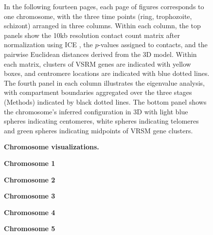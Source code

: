\thispagestyle{empty}
\pagestyle{empty}
\begin{figure}
\caption{{\bf Chromosome visualizations.}}
{ In the following fourteen pages, each page of figures corresponds to one chromosome, with the three time points (ring, trophozoite, schizont) arranged in three columns.  Within each column, the top panels show the 10kb resolution contact count matrix after normalization using ICE \cite{imakaev:iterative}, the $p$-values assigned to contacts, and the pairwise Euclidean distances derived from the 3D model.  Within each matrix, clusters of VSRM genes are indicated with yellow boxes, and centromere locations are indicated with blue dotted lines.  The fourth panel in each column illustrates the eigenvalue analysis, with compartment boundaries aggregated over the three stages (Methods) indicated by black dotted lines. The bottom panel shows the chromosome's inferred configuration in 3D with light blue spheres indicating centomeres, white spheres indicating telomeres and green spheres indicating midpoints of VRSM gene clusters.}
\label{suppfig:perChrFigs}
\end{figure}

\setcounter{figure}{2} %
\begin{figure}
\textbf{Chromosome 1}
\centering
{}
\end{figure}

\begin{figure}
\textbf{Chromosome 2}
\centering
\ContinuedFloat
{}
\end{figure}

\begin{figure}
\textbf{Chromosome 3}
\centering
\ContinuedFloat
{}
\end{figure}

\begin{figure}
\textbf{Chromosome 4}
\centering
\ContinuedFloat
{}
\end{figure}

\begin{figure}
\textbf{Chromosome 5}
\centering
\ContinuedFloat
{}
\end{figure}

